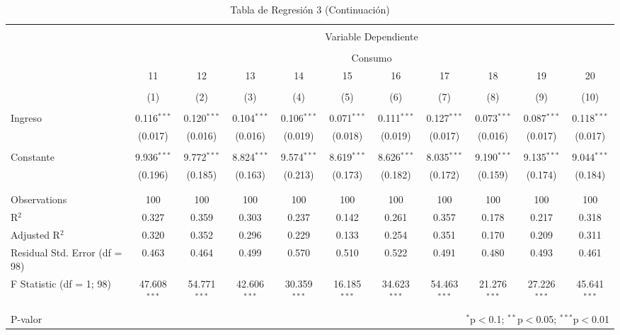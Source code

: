 \documentclass[
]{article}
\begin{document}
\begin{landscape}
\begin{table}[!htbp] \centering 
  \caption{Tabla de Regresión 3 (Continuación)} 
  \label{} 
\footnotesize 
\begin{tabular}{@{\extracolsep{5pt}}lcccccccccc} 
\\[-1.8ex]\hline 
\hline \\[-1.8ex] 
 & \multicolumn{10}{c}{Variable Dependiente} \\ 
\cline{2-11} 
\\[-1.8ex] & \multicolumn{10}{c}{Consumo} \\ 
 & 11 & 12 & 13 & 14 & 15 & 16 & 17 & 18 & 19 & 20 \\ 
\\[-1.8ex] & (1) & (2) & (3) & (4) & (5) & (6) & (7) & (8) & (9) & (10)\\ 
\hline \\[-1.8ex] 
 Ingreso & 0.116$^{***}$ & 0.120$^{***}$ & 0.104$^{***}$ & 0.106$^{***}$ & 0.071$^{***}$ & 0.111$^{***}$ & 0.127$^{***}$ & 0.073$^{***}$ & 0.087$^{***}$ & 0.118$^{***}$ \\ 
  & (0.017) & (0.016) & (0.016) & (0.019) & (0.018) & (0.019) & (0.017) & (0.016) & (0.017) & (0.017) \\ 
  & & & & & & & & & & \\ 
 Constante & 9.936$^{***}$ & 9.772$^{***}$ & 8.824$^{***}$ & 9.574$^{***}$ & 8.619$^{***}$ & 8.626$^{***}$ & 8.035$^{***}$ & 9.190$^{***}$ & 9.135$^{***}$ & 9.044$^{***}$ \\ 
  & (0.196) & (0.185) & (0.163) & (0.213) & (0.173) & (0.182) & (0.172) & (0.159) & (0.174) & (0.184) \\ 
  & & & & & & & & & & \\ 
\hline \\[-1.8ex] 
Observations & 100 & 100 & 100 & 100 & 100 & 100 & 100 & 100 & 100 & 100 \\ 
R$^{2}$ & 0.327 & 0.359 & 0.303 & 0.237 & 0.142 & 0.261 & 0.357 & 0.178 & 0.217 & 0.318 \\ 
Adjusted R$^{2}$ & 0.320 & 0.352 & 0.296 & 0.229 & 0.133 & 0.254 & 0.351 & 0.170 & 0.209 & 0.311 \\ 
Residual Std. Error (df = 98) & 0.463 & 0.464 & 0.499 & 0.570 & 0.510 & 0.522 & 0.491 & 0.480 & 0.493 & 0.461 \\ 
F Statistic (df = 1; 98) & 47.608$^{***}$ & 54.771$^{***}$ & 42.606$^{***}$ & 30.359$^{***}$ & 16.185$^{***}$ & 34.623$^{***}$ & 54.463$^{***}$ & 21.276$^{***}$ & 27.226$^{***}$ & 45.641$^{***}$ \\ 
\hline 
\hline \\[-1.8ex] 
P-valor & \multicolumn{10}{r}{$^{*}$p$<$0.1; $^{**}$p$<$0.05; $^{***}$p$<$0.01} \\ 
\end{tabular} 
\end{table} 

\end{landscape}
\newpage
\end{document}
